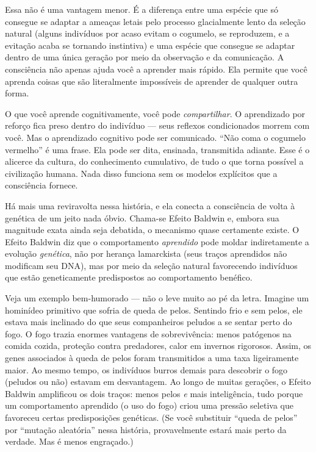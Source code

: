 \documentclass[11pt, twoside, openright]{book}
\begin{document}
Essa não é uma vantagem menor. É a diferença entre uma espécie que só consegue se adaptar a ameaças letais pelo processo glacialmente lento da seleção natural (alguns indivíduos por acaso evitam o cogumelo, se reproduzem, e a evitação acaba se tornando instintiva) e uma espécie que consegue se adaptar dentro de uma única geração por meio da observação e da comunicação. A consciência não apenas ajuda você a aprender mais rápido. Ela permite que você aprenda coisas que são literalmente impossíveis de aprender de qualquer outra forma.

O que você aprende cognitivamente, você pode \textit{compartilhar}. O aprendizado por reforço fica preso dentro do indivíduo --- seus reflexos condicionados morrem com você. Mas o aprendizado cognitivo pode ser comunicado. ``Não coma o cogumelo vermelho'' é uma frase. Ela pode ser dita, ensinada, transmitida adiante. Esse é o alicerce da cultura, do conhecimento cumulativo, de tudo o que torna possível a civilização humana. Nada disso funciona sem os modelos explícitos que a consciência fornece.

Há mais uma reviravolta nessa história, e ela conecta a consciência de volta à genética de um jeito nada óbvio. Chama-se Efeito Baldwin e, embora sua magnitude exata ainda seja debatida, o mecanismo quase certamente existe. O Efeito Baldwin diz que o comportamento \textit{aprendido} pode moldar indiretamente a evolução \textit{genética}, não por herança lamarckista (seus traços aprendidos não modificam seu DNA), mas por meio da seleção natural favorecendo indivíduos que estão geneticamente predispostos ao comportamento benéfico.

Veja um exemplo bem-humorado --- não o leve muito ao pé da letra. Imagine um hominídeo primitivo que sofria de queda de pelos. Sentindo frio e sem pelos, ele estava mais inclinado do que seus companheiros peludos a se sentar perto do fogo. O fogo trazia enormes vantagens de sobrevivência: menos patógenos na comida cozida, proteção contra predadores, calor em invernos rigorosos. Assim, os genes associados à queda de pelos foram transmitidos a uma taxa ligeiramente maior. Ao mesmo tempo, os indivíduos burros demais para descobrir o fogo (peludos ou não) estavam em desvantagem. Ao longo de muitas gerações, o Efeito Baldwin amplificou os dois traços: menos pelos \textit{e} mais inteligência, tudo porque um comportamento aprendido (o uso do fogo) criou uma pressão seletiva que favoreceu certas predisposições genéticas. (Se você substituir ``queda de pelos'' por ``mutação aleatória'' nessa história, provavelmente estará mais perto da verdade. Mas é menos engraçado.)
\end{document}
